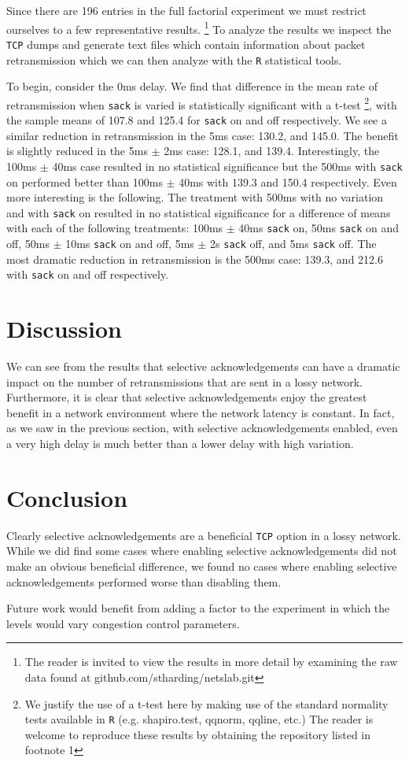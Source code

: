 \documentclass[]{article}
\begin{document}
Since there are 196 entries in the full factorial experiment we must restrict ourselves
to a few representative results. \footnote{The reader is invited to view the results 
in more detail by examining the raw data found at github.com/stharding/netslab.git} 
To analyze the results we inspect the \texttt{TCP} dumps and generate text files which
contain information about packet retransmission which we can then analyze with the
\texttt{R} statistical tools.

To begin, consider the 0ms delay. We find that difference in the mean rate of retransmission
when \texttt{sack} is varied is statistically significant with  a t-test \footnote{We
justify the use of a t-test here by making use of the standard normality tests available
in \texttt{R} (e.g. shapiro.test, qqnorm, qqline, etc.) The reader is welcome to reproduce
these results by obtaining the repository listed in footnote 1}, with the sample means of
107.8 and 125.4 for \texttt{sack} on and off respectively. We see a similar reduction in
retransmission in the 5ms case: 130.2, and 145.0. The benefit is slightly reduced in the 5ms 
$\pm$ 2ms case: 128.1, and 139.4. Interestingly, the 100ms $\pm$ 40ms case resulted in no
statistical significance but the 500ms with \texttt{sack} on performed better than 100ms 
$\pm$ 40ms with 139.3 and 150.4 respectively. Even more interesting is the following. The
treatment with 500ms with no variation and with \texttt{sack} on resulted in no statistical 
significance for a difference of means with each of the following treatments: 100ms $\pm$ 
40ms \texttt{sack} on, 50ms \texttt{sack} on and off, 50ms $\pm$ 10ms \texttt{sack} on and 
off, 5ms $\pm$ 2s \texttt{sack} off, and 5ms \texttt{sack} off. The most dramatic reduction 
in retransmission is the 500ms case: 139.3, and 212.6 with \texttt{sack} on and off 
respectively.

\section{Discussion}\label{discussion}
We can see from the results that selective acknowledgements can have a dramatic impact
on the number of retransmissions that are sent in a lossy network. Furthermore, it is clear
that selective acknowledgements enjoy the greatest benefit in a network environment where
the network latency is constant. In fact, as we saw in the previous section, with selective
acknowledgements enabled, even a very high delay is much better than a lower delay with
high variation.

\section{Conclusion}\label{conclusion}
Clearly selective acknowledgements are a beneficial \texttt{TCP} option in a lossy network.
While we did find some cases where enabling selective acknowledgements did not make an
obvious beneficial difference, we found no cases where enabling selective acknowledgements 
performed worse than disabling them.

Future work would benefit from adding a factor to the experiment in which the levels would
vary congestion control parameters.

{}

\end{document}
